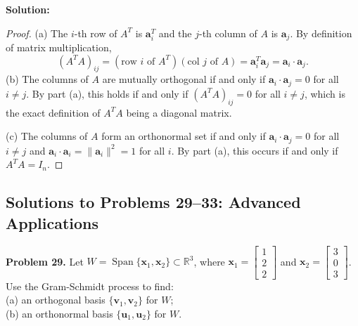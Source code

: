 \documentclass[11pt, letterpaper]{article}
\theoremstyle{definition}
\theoremstyle{remark}
\begin{document}
\textbf{Solution:}
\begin{proof}
(a) The $i$-th row of $A^T$ is $\mathbf{a}_i^T$ and the $j$-th column of $A$ is $\mathbf{a}_j$. By definition of matrix multiplication,
\[
(A^T A)_{ij} = (\text{row } i \text{ of } A^T)(\text{col } j \text{ of } A) = \mathbf{a}_i^T \mathbf{a}_j = \mathbf{a}_i \cdot \mathbf{a}_j.
\]
(b) The columns of $A$ are mutually orthogonal if and only if $\mathbf{a}_i \cdot \mathbf{a}_j = 0$ for all $i \neq j$. By part (a), this holds if and only if $(A^T A)_{ij} = 0$ for all $i \neq j$, which is the exact definition of $A^T A$ being a diagonal matrix.

(c) The columns of $A$ form an orthonormal set if and only if $\mathbf{a}_i \cdot \mathbf{a}_j = 0$ for all $i \neq j$ and $\mathbf{a}_i \cdot \mathbf{a}_i = \|\mathbf{a}_i\|^2 = 1$ for all $i$. By part (a), this occurs if and only if $A^T A = I_n$.
\end{proof}

\subsection{Solutions to Problems 29--33: Advanced Applications}

\textbf{Problem 29.} Let $W = \operatorname{Span}\{\mathbf{x}_1, \mathbf{x}_2\} \subset \mathbb{R}^3$, where $\mathbf{x}_1 = \begin{bmatrix} 1 \\ 2 \\ 2 \end{bmatrix}$ and $\mathbf{x}_2 = \begin{bmatrix} 3 \\ 0 \\ 3 \end{bmatrix}$. Use the Gram-Schmidt process to find: \\
(a) an orthogonal basis $\{\mathbf{v}_1, \mathbf{v}_2\}$ for $W$; \\
(b) an orthonormal basis $\{\mathbf{u}_1, \mathbf{u}_2\}$ for $W$.
\end{document}
